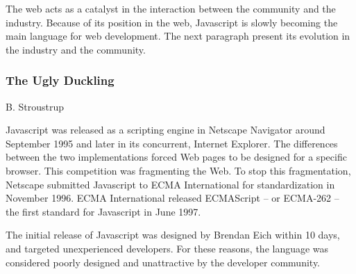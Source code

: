 The web acts as a catalyst in the interaction between the community and the industry.
Because of its position in the web, Javascript is slowly becoming the main language for web development.
The next paragraph present its evolution in the industry and the community.


\subsubsection{The Ugly Duckling}


%
{B. Stroustrup}



Javascript was released as a scripting engine in Netscape Navigator around September 1995 and later in its concurrent, Internet Explorer.
The differences between the two implementations forced Web pages to be designed for a specific browser.
This competition was fragmenting the Web.
To stop this fragmentation, Netscape submitted Javascript to ECMA International for standardization in November 1996.
ECMA International released  ECMAScript -- or ECMA-262 -- the first standard for Javascript in June 1997. %

The initial release of Javascript was designed by Brendan Eich within 10 days, and targeted unexperienced developers.
For these reasons, the language was considered poorly designed and unattractive by the developer community.




